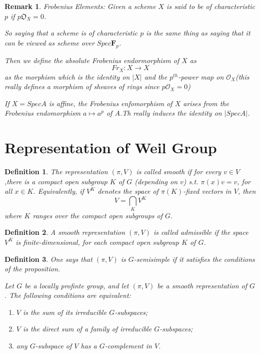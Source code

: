 \documentclass{article}
\theoremstyle{theorem}
\newtheorem{defe}{Definition}
\newtheorem{rem}{Remark}
\begin{document}
\begin{rem}
\emph{Frobenius Elements}:
Given a scheme $X$ is said to be of characteristic $p$ if $p\mathfrak{O}_{X}=0$. 


So saying that a scheme is of characteristic $p$ is the same thing as saying that it can be viewed as scheme over $Spec\mathbf{F}_{p}$.

Then we define the absolute Frobenius endormorphism of $X$ as $$Fr_{X}:X\rightarrow X$$
as the morphism which is the identity on $|X|$ and the $p^{th}$-power map on $\mathcal{O}_{X}$(this really defines a morphism of sheaves of rings since $p\mathcal{O}_{X}=0$)

If $X=Spec A$ is affine, the Frobenius enfomorphism of $X$ arises from the Frobenius endomorphism $a\mapsto a^{p}$ of $A$.Th really induces the identity on $|Spec A|$.
\end{rem}


\section{Representation of Weil Group}


\begin{defe}
The representation $(\pi,V)$ is called smooth if for every $v\in V$,there is a compact open subgroup $K$ of $G$ (depending on $v$) s.t. $\pi(x)v=v$, for all $x\in K$. Equivalently, if $V^{K}$ denotes the space of $\pi(K)$-fixed vectors in $V$, then 
\begin{equation*}
    V=\bigcap\limits_{K}V^{K}
\end{equation*}
where $K$ ranges over the compact open subgroups of $G$.
\end{defe}

\begin{defe}
A smooth representation $(\pi,V)$ is called admissible if the space $V^{K}$ is finite-dimensional, for each compact open subgroup $K$ of $G$.
\end{defe}

\begin{defe}
One says that $(\pi,V)$ is $G$-semisimple if it satisfies the conditions of the proposition. 

Let $G$ be a locally profinte group, and let $(\pi,V)$ be a smooth representation of $G$. The following conditions are equivalent:
\begin{enumerate}
    \item $V$ is the sum of its irreducible $G$-subspaces;
    \item $V$ is the direct sum of a family of irreducible $G$-subspaces;
    \item any $G$-subspace of $V$ has a $G$-complement in $V$.
\end{enumerate}
\end{defe}
\end{document}
